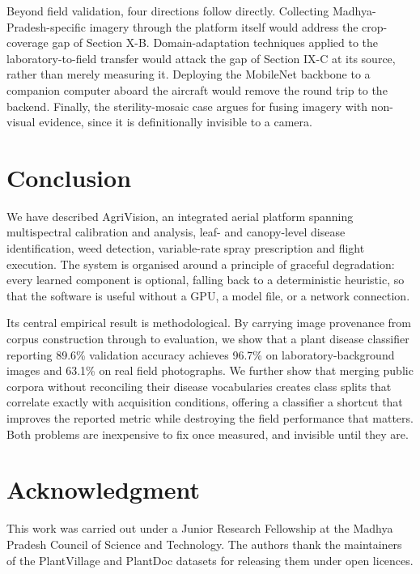 \documentclass[conference]{IEEEtran}
\begin{document}
Beyond field validation, four directions follow directly. Collecting
Madhya-Pradesh-specific imagery through the platform itself would address the
crop-coverage gap of Section X-B. Domain-adaptation techniques applied to the
laboratory-to-field transfer would attack the gap of Section IX-C at its
source, rather than merely measuring it. Deploying the MobileNet backbone to a
companion computer aboard the aircraft would remove the round trip to the
backend. Finally, the sterility-mosaic case argues for fusing imagery with
non-visual evidence, since it is definitionally invisible to a camera.

\section{Conclusion}

We have described AgriVision, an integrated aerial platform spanning
multispectral calibration and analysis, leaf- and canopy-level disease
identification, weed detection, variable-rate spray prescription and flight
execution. The system is organised around a principle of graceful degradation:
every learned component is optional, falling back to a deterministic heuristic,
so that the software is useful without a GPU, a model file, or a network
connection.

Its central empirical result is methodological. By carrying image provenance
from corpus construction through to evaluation, we show that a plant disease
classifier reporting 89.6\% validation accuracy achieves 96.7\% on
laboratory-background images and 63.1\% on real field photographs. We further
show that merging public corpora without reconciling their disease vocabularies
creates class splits that correlate exactly with acquisition conditions,
offering a classifier a shortcut that improves the reported metric while
destroying the field performance that matters. Both problems are inexpensive to
fix once measured, and invisible until they are.

\section*{Acknowledgment}

This work was carried out under a Junior Research Fellowship at the Madhya
Pradesh Council of Science and Technology. The authors thank the maintainers of
the PlantVillage and PlantDoc datasets for releasing them under open licences.
\end{document}
